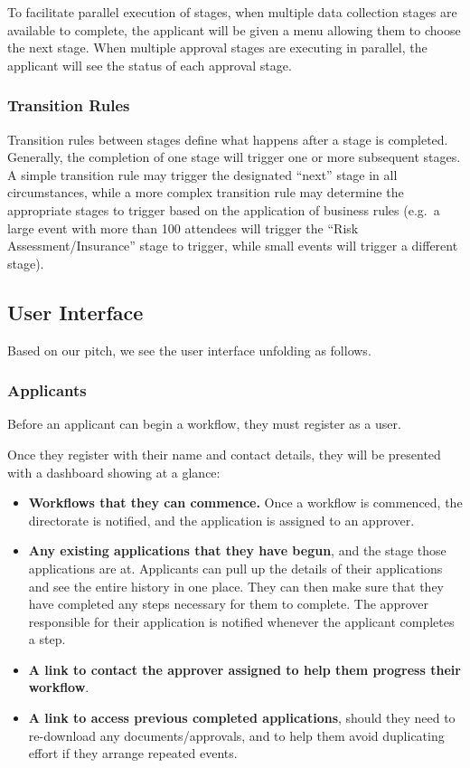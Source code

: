 \documentclass[12pt,a4paper,twosided]{article}
\begin{document}
To facilitate parallel execution of stages, when multiple data
collection stages are available to complete, the applicant will be given
a menu allowing them to choose the next stage. When multiple approval
stages are executing in parallel, the applicant will see the status of
each approval stage.

\subsubsection{Transition Rules}\label{transition-rules}

Transition rules between stages define what happens after a stage is
completed. Generally, the completion of one stage will trigger one or
more subsequent stages. A simple transition rule may trigger the
designated ``next'' stage in all circumstances, while a more complex
transition rule may determine the appropriate stages to trigger based on
the application of business rules (e.g.~a large event with more than 100
attendees will trigger the ``Risk Assessment/Insurance'' stage to
trigger, while small events will trigger a different stage).

\subsection{User Interface}\label{user-interface}

Based on our pitch, we see the user interface unfolding as follows.

\subsubsection{Applicants}\label{applicants-1}

Before an applicant can begin a workflow, they must register as a user.

Once they register with their name and contact details, they will be
presented with a dashboard showing at a glance:

\begin{itemize}
\itemsep1pt\parskip0pt
\item
  \textbf{Workflows that they can commence.} Once a workflow is
  commenced, the directorate is notified, and the application is
  assigned to an approver.
\item
  \textbf{Any existing applications that they have begun}, and the stage
  those applications are at. Applicants can pull up the details of their
  applications and see the entire history in one place. They can then
  make sure that they have completed any steps necessary for them to
  complete. The approver responsible for their application is notified
  whenever the applicant completes a step.
\item
  \textbf{A link to contact the approver assigned to help them progress
  their workflow}.
\item
  \textbf{A link to access previous completed applications}, should they
  need to re-download any documents/approvals, and to help them avoid
  duplicating effort if they arrange repeated events.
\end{itemize}
\end{document}
